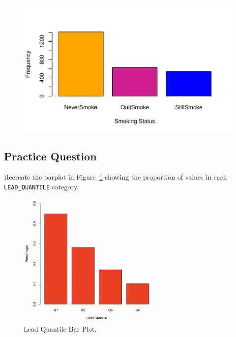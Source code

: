 \documentclass[
  letterpaper,
]{krantz}
\begin{document}
\begin{figure}[H]

{\centering \includegraphics[width=1\textwidth,height=\textheight]{book/4_exploratory_analysis_files/figure-pdf/unnamed-chunk-11-1.pdf}

}

\end{figure}

\hypertarget{practice-question-6}{%
\subsection{Practice Question}\label{practice-question-6}}

Recreate the barplot in Figure~\ref{fig-pq1} showing the proportion of
values in each \texttt{LEAD\_QUANTILE} category.

\begin{figure}

{\centering \includegraphics[width=2.77778in,height=\textheight]{book/images/4-practicequestion1answer.png}

}

\caption{\label{fig-pq1}Lead Quantile Bar Plot.}

\end{figure}
\end{document}
